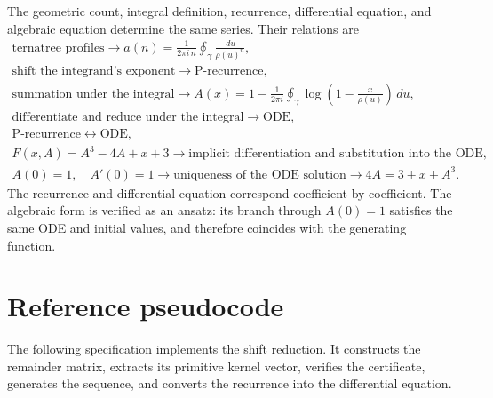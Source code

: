 \documentclass[11pt,fleqn]{article}
\theoremstyle{plain}
\newcommand{\dd}{\,d}
\begin{document}
The geometric count, integral definition, recurrence, differential equation,
and algebraic equation determine the same series. Their relations are
\[
\begin{array}{l}
    \text{ternatree profiles}
    \longrightarrow
    \displaystyle a(n)=\frac{1}{2\pi i\,n}
    \oint_\gamma\frac{\dd u}{\rho(u)^n},\\[1.1em]
    \text{shift the integrand's exponent}
    \longrightarrow
    \text{P-recurrence},\\[0.6em]
    \text{summation under the integral}
    \longrightarrow
    \displaystyle A(x)=1-\frac{1}{2\pi i}\oint_\gamma
    \log\!\left(1-\frac{x}{\rho(u)}\right)\dd u,\\[0.6em]
    \text{differentiate and reduce under the integral}
    \longrightarrow
    \text{ODE},\\[0.6em]
    \text{P-recurrence}
    \longleftrightarrow
    \text{ODE},\\[0.6em]
    F(x,A)=A^3-4A+x+3
    \longrightarrow
    \text{implicit differentiation and substitution into the ODE},\\[0.6em]
    A(0)=1,\quad A'(0)=1
    \longrightarrow
    \text{uniqueness of the ODE solution}
    \longrightarrow
    4A=3+x+A^3.
\end{array}
\]
The recurrence and differential equation correspond coefficient by
coefficient. The algebraic form is verified as an ansatz: its branch through
$A(0)=1$ satisfies the same ODE and initial values, and therefore coincides
with the generating function.

\clearpage
	\section{Reference pseudocode}
	
	The following specification implements the shift reduction.  It constructs the
	remainder matrix, extracts its primitive kernel vector, verifies the certificate,
	generates the sequence, and converts the recurrence into the differential equation.
	\begin{center}
	\begin{minipage}{0.96\textwidth}
	\end{minipage}
	\end{center}
	
	\clearpage
\end{document}
